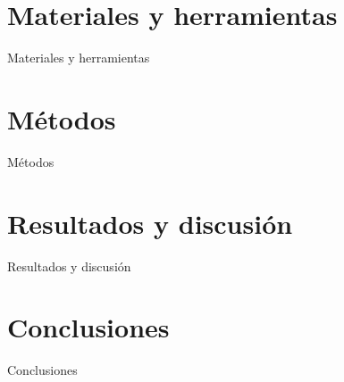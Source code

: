 \documentclass[spanish,a4paper]{beamer}%
\makeatletter
\def\beamer@writeslidentry@miniframesoff{%
  \expandafter\beamer@ifempty\expandafter{\beamer@framestartpage}{}%
  {%
    \clearpage\beamer@notesactions%
  }
}
\newcommand*{\miniframesoff}{\let\beamer@writeslidentry=\beamer@writeslidentry@miniframesoff}
\makeatother
\begin{document}
	\section{Materiales y herramientas}
	\begin{frame}{Materiales y herramientas}
		
	\end{frame}

	\section{Métodos}
	\begin{frame}{Métodos}
		
	\end{frame}

	\section{Resultados y discusión}
	\begin{frame}{Resultados y discusión}

	\end{frame}

	\section{Conclusiones}
	\begin{frame}{Conclusiones}
		
	\end{frame}

	\miniframesoff
	\section{}
	\begin{frame}	

	\end{frame}
\end{document}
